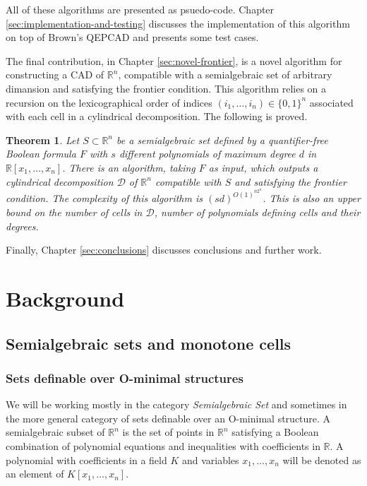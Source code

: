 \documentclass[
]{book}
\newtheorem{theorem}{Theorem}[chapter]
\theoremstyle{definition}
\theoremstyle{definition}
\theoremstyle{definition}
\theoremstyle{definition}
\theoremstyle{remark}
\begin{document}
All of these algorithms are presented as psuedo-code. Chapter \ref{sec:implementation-and-testing} discusses the implementation of this algorithm on top of Brown's QEPCAD \citep{brownQepcad} and presents some test cases.

The final contribution, in Chapter \ref{sec:novel-frontier}, is a novel algorithm for constructing a CAD of \(\mathbb{R}^n\), compatible with a semialgebraic set of arbitrary dimansion and satisfying the frontier condition. This algorithm relies on a recursion on the lexicographical order of indices \((i_1,\ldots,i_n) \in \{ 0,1 \}^n\) associated with each cell in a cylindrical decomposition. The following is proved.

\begin{theorem}
\protect\hypertarget{thm:main}{}\label{thm:main}Let \(S \subset \mathbb{R}^n\) be a semialgebraic set defined by a quantifier-free Boolean formula \(F\) with \(s\) different polynomials of maximum degree \(d\) in \(\mathbb{R}[x_1,\ldots,x_n]\).
There is an algorithm, taking \(F\) as input, which outputs a cylindrical decomposition \(\mathcal D\) of \(\mathbb{R}^n\) compatible with \(S\) and
satisfying the frontier condition.
The complexity of this algorithm is \((sd)^{O(1)^{n2^n}}\).
This is also an upper bound on the number of cells in \(\mathcal D\), number of polynomials defining cells and their degrees.
\end{theorem}

Finally, Chapter \ref{sec:conclusions} discusses conclusions and further work.

\hypertarget{sec:background}{%
\chapter{Background}\label{sec:background}}

\hypertarget{semialgebraic-sets-and-monotone-cells}{%
\section{Semialgebraic sets and monotone cells}\label{semialgebraic-sets-and-monotone-cells}}

\hypertarget{sets-definable-over-o-minimal-structures}{%
\subsection{Sets definable over O-minimal structures}\label{sets-definable-over-o-minimal-structures}}

We will be working mostly in the category \emph{Semialgebraic Set} and sometimes in the more general category of sets definable over an O-minimal structure.
A semialgebraic subset of \(\mathbb{R}^n\) is the set of points in \(\mathbb{R}^n\) satisfying a Boolean combination of polynomial equations and inequalities with coefficients in \(\mathbb{R}\).
A polynomial with coefficients in a field \(K\) and variables \(x_1,\ldots,x_n\) will be denoted as an element of \(K[x_1,\ldots,x_n]\).
\end{document}
